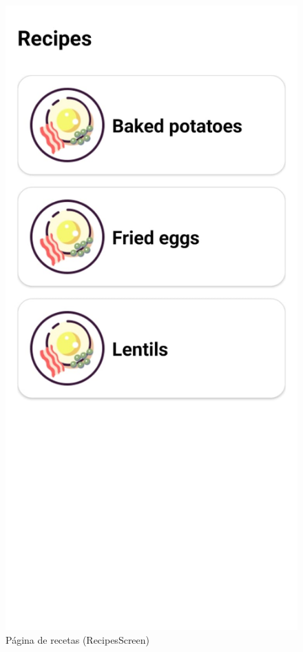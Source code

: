 \documentclass[twoside, openright, 11pt]{report}
\begin{document}
					\begin{figure}[H]
						\centering
						\includegraphics[scale=0.3]{imagenes/RecipesScreen}
						\caption{Página de recetas (RecipesScreen)}
						\label{fig:RecipesScreen}
					\end{figure}
\end{document}

